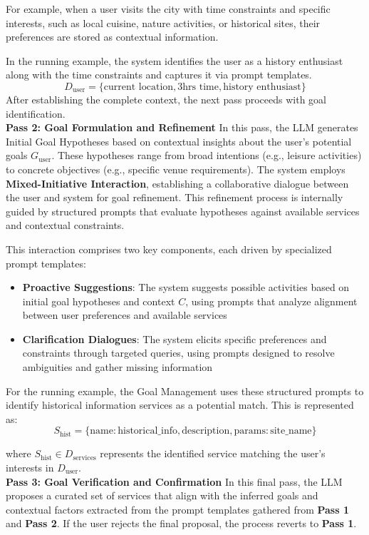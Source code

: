 For example, when a user visits the city with time constraints and specific interests, such as local cuisine, nature activities, or historical sites, their preferences are stored as contextual information.

In the running example, the system identifies the user as a history enthusiast along with the time constraints and captures it via prompt templates.
\[
D_{\text{user}} = \{
\text{current location}, \text{3hrs time}, \text{history enthusiast}
\}
\]
After establishing the complete context, the next pass proceeds with goal identification. \\
\textbf{Pass 2: Goal Formulation and Refinement}
In this pass, the LLM generates Initial Goal Hypotheses based on contextual insights about the user's potential goals $G_{\text{user}}$. These hypotheses range from broad intentions (e.g., leisure activities) to concrete objectives (e.g., specific venue requirements). The system employs \textbf{Mixed-Initiative Interaction}, establishing a collaborative dialogue between the user and system for goal refinement. This refinement process is internally guided by structured prompts that evaluate hypotheses against available services and contextual constraints.

This interaction comprises two key components, each driven by specialized prompt templates:
\begin{itemize}
    \item \textbf{Proactive Suggestions}: The system suggests possible activities based on initial goal hypotheses and context $C$, using prompts that analyze alignment between user preferences and available services
    \item \textbf{Clarification Dialogues}: The system elicits specific preferences and constraints through targeted queries, using prompts designed to resolve ambiguities and gather missing information
\end{itemize}

For the running example, the Goal Management uses these structured prompts to identify historical information services as a potential match. This is represented as:
\[
S_{\text{hist}} = \{
    \text{name}: \text{historical\_info},
    \text{description},
    \text{params}: \text{site\_name}
\}
\]

where $S_{\text{hist}} \in D_{\text{services}}$ represents the identified service matching the user's interests in $D_{\text{user}}$. \\
\textbf{Pass 3: Goal Verification and Confirmation}
In this final pass, the LLM proposes a curated set of services that align with the inferred goals and contextual factors extracted from the prompt templates gathered from \textbf{Pass 1} and \textbf{Pass 2}. If the user rejects the final proposal, the process reverts to \textbf{Pass 1}.


